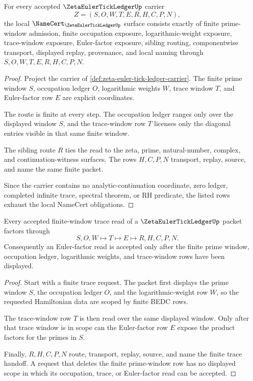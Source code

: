 \begin{theorem}
\label{thm:zeta-euler-tick-ledger-namecert-obligations}
For every accepted $\ZetaEulerTickLedgerUp$ carrier
$$
Z=(S,O,W,T,E,R,H,C,P,N),
$$
the local $\NameCert_{\ZetaEulerTickLedgerUp}$ surface consists exactly of finite prime-window admission, finite occupation exposure, logarithmic-weight exposure, trace-window exposure, Euler-factor exposure, sibling routing, componentwise transport, displayed replay, provenance, and local naming through $S,O,W,T,E,R,H,C,P,N$.
\end{theorem}
\begin{proof}
Project the carrier of \autoref{def:zeta-euler-tick-ledger-carrier}. The finite prime window $S$, occupation ledger $O$, logarithmic weights $W$, trace window $T$, and Euler-factor row $E$ are explicit coordinates.

The route is finite at every step. The occupation ledger ranges only over the displayed window $S$, and the trace-window row $T$ licenses only the diagonal entries visible in that same finite window.

The sibling route $R$ ties the read to the zeta, prime, natural-number, complex, and continuation-witness surfaces. The rows $H,C,P,N$ transport, replay, source, and name the same finite packet.

Since the carrier contains no analytic-continuation coordinate, zero ledger, completed infinite trace, spectral theorem, or RH predicate, the listed rows exhaust the local NameCert obligations.
\end{proof}

\begin{theorem}
\label{thm:zeta-euler-tick-ledger-finite-trace-handoff}
Every accepted finite-window trace read of a $\ZetaEulerTickLedgerUp$ packet factors through
$$
S,O,W \longmapsto T \longmapsto E \longmapsto R,H,C,P,N.
$$
Consequently an Euler-factor read is accepted only after the finite prime window, occupation ledger, logarithmic weights, and trace-window rows have been displayed.
\end{theorem}
\begin{proof}
Start with a finite trace request. The packet first displays the prime window $S$, the occupation ledger $O$, and the logarithmic-weight row $W$, so the requested Hamiltonian data are scoped by finite BEDC rows.

The trace-window row $T$ is then read over the same displayed window. Only after that trace window is in scope can the Euler-factor row $E$ expose the product factors for the primes in $S$.

Finally, $R,H,C,P,N$ route, transport, replay, source, and name the finite trace handoff. A request that deletes the finite prime-window row has no displayed scope in which its occupation, trace, or Euler-factor read can be accepted.
\end{proof}

